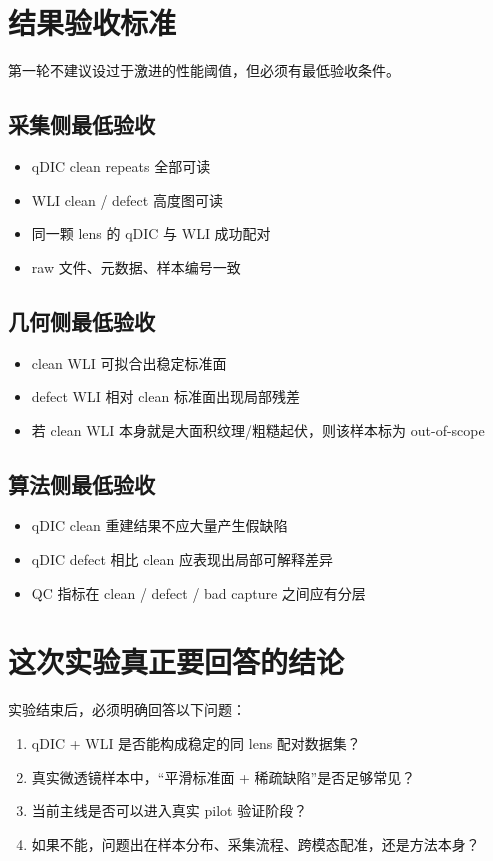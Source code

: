 \documentclass[UTF8,a4paper,11pt]{ctexart}
\begin{document}
\section{结果验收标准}

第一轮不建议设过于激进的性能阈值，但必须有最低验收条件。

\subsection{采集侧最低验收}
\begin{itemize}
  \item qDIC clean repeats 全部可读
  \item WLI clean / defect 高度图可读
  \item 同一颗 lens 的 qDIC 与 WLI 成功配对
  \item raw 文件、元数据、样本编号一致
\end{itemize}

\subsection{几何侧最低验收}
\begin{itemize}
  \item clean WLI 可拟合出稳定标准面
  \item defect WLI 相对 clean 标准面出现局部残差
  \item 若 clean WLI 本身就是大面积纹理/粗糙起伏，则该样本标为 out-of-scope
\end{itemize}

\subsection{算法侧最低验收}
\begin{itemize}
  \item qDIC clean 重建结果不应大量产生假缺陷
  \item qDIC defect 相比 clean 应表现出局部可解释差异
  \item QC 指标在 clean / defect / bad capture 之间应有分层
\end{itemize}

\section{这次实验真正要回答的结论}

实验结束后，必须明确回答以下问题：
\begin{enumerate}
  \item qDIC + WLI 是否能构成稳定的同 lens 配对数据集？
  \item 真实微透镜样本中，“平滑标准面 + 稀疏缺陷”是否足够常见？
  \item 当前主线是否可以进入真实 pilot 验证阶段？
  \item 如果不能，问题出在样本分布、采集流程、跨模态配准，还是方法本身？
\end{enumerate}
\end{document}
